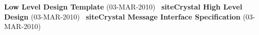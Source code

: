 {\bfseries Low Level Design Template} (03-\/\+M\+A\+R-\/2010)~\newline
 {\bfseries site\+Crystal High Level Design} (03-\/\+M\+A\+R-\/2010)~\newline
 {\bfseries site\+Crystal Message Interface Specification} (03-\/\+M\+A\+R-\/2010)~\newline
 